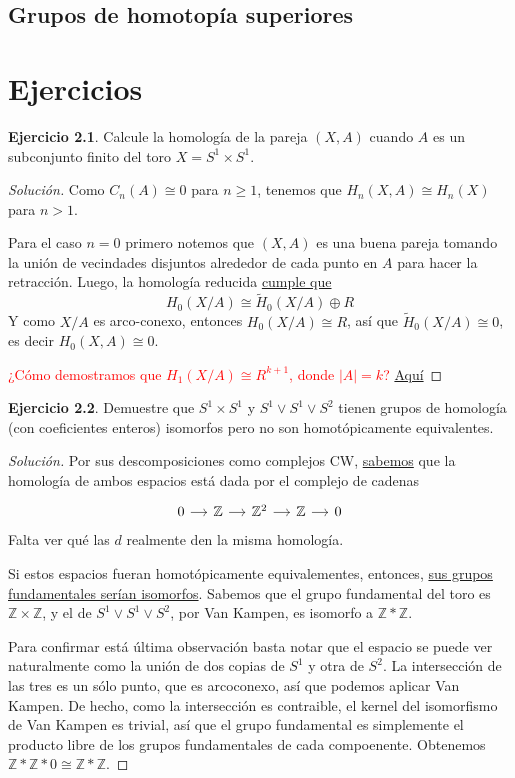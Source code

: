 \documentclass[spanish]{book}
\theoremstyle{definition}
\newtheorem*{ejer}{Ejercicio}
\newcommand{\Z}{\mathbb{Z}}
\begin{document}
\section{Grupos de homotopía superiores}
	
\newpage
\chapter{Ejercicios}
	\begin{ejer}
	Calcule la homología de la pareja $(X,A)$ cuando $A$ es un subconjunto finito del toro $X=S^1\times S^1$.
\end{ejer}
\begin{proof}[Solución]
	Como $C_n(A)\cong0$ para $n\geq1$, tenemos que $H_n(X,A)\cong H_n(X)$ para $n>1$.
	
	Para el caso $n=0$ primero notemos que $(X,A)$ es una buena pareja tomando la unión de vecindades disjuntos alrededor de cada punto en $A$ para hacer la retracción. Luego, la homología reducida \hyperref[sec:6.4]{cumple que}
	\[H_0(X/A)\cong\tilde{H}_0(X/A)\oplus R\]
	Y como $X/A$ es arco-conexo, entonces $H_0(X/A)\cong R$, así que $\tilde{H}_0(X/A)\cong0$, es decir $H_0(X,A)\cong0$.
	
	\textcolor{red}{¿Cómo demostramos que $H_1(X/A)\cong R^{k+1}$, donde $|A|=k$?} \href{https://math.stackexchange.com/questions/129686/finding-the-homology-group-of-h-n-x-a-when-a-is-a-finite-set-of-points}{Aquí}
\end{proof}
\begin{ejer}Demuestre que $S^1 \times S^1$ y $S^1 \vee S^1 \vee S^2$ tienen grupos de homología (con coeficientes enteros) isomorfos pero no son homotópicamente equivalentes.
\begin{proof}[Solución]
	Por sus descomposiciones como complejos CW, \hyperref[obs1]{sabemos} que la homología de ambos espacios está dada por el complejo de cadenas
	\[\begin{tikzcd}[column sep=small]
		0\arrow[r]&\Z\arrow[r]&\Z^2\arrow[r]&\Z\arrow[r]&0
	\end{tikzcd}\]
	\textcolor{blue-violet}{Falta ver qué las $d$ realmente den la misma homología}.
	
	Si estos espacios fueran homotópicamente equivalementes, entonces, \hyperref[1.2.1]{sus grupos fundamentales serían isomorfos}. Sabemos que el grupo fundamental del toro es $\Z\times\Z$, y el de $S^1 \vee S^1 \vee S^2$, por Van Kampen, es isomorfo a $\Z\ast\Z$.
	
	Para confirmar está última observación basta notar que el espacio se puede ver naturalmente como la unión de dos copias de $S^1$ y otra de $S^2$. La intersección de las tres es un sólo punto, que es arcoconexo, así que podemos aplicar Van Kampen. De hecho, como la intersección es contraible, el kernel del isomorfismo de Van Kampen es trivial, así que el grupo fundamental es simplemente el producto libre de los grupos fundamentales de cada compoenente. Obtenemos $\Z\ast\Z\ast0\cong\Z\ast\Z$.
\end{proof}
\end{ejer}
\end{document}
